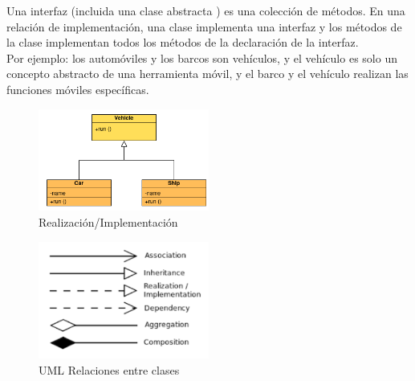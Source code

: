 \documentclass[../main.tex]{subfiles}
\begin{document}
\begin{enumerate}
                Una interfaz (incluida una clase abstracta ) es una colección de métodos. En una relación de implementación, una clase implementa una interfaz y los métodos de la clase implementan todos los métodos de la declaración de la interfaz.\\
                
                Por ejemplo: los automóviles y los barcos son vehículos, y el vehículo es solo un concepto abstracto de una herramienta móvil, y el barco y el vehículo realizan las funciones móviles específicas.


                \begin{figure}[ht]
                    \centering
                    \includegraphics[width=0.5\textwidth]{../images/uml_realizacion.png}
                    \caption{Realización/Implementación}
                    \label{fig:uml_realizacion}
                \end{figure}
        \end{enumerate}

        \begin{figure}[ht]
            \centering
            \includegraphics[width=0.5\textwidth]{../images/uml_relaciones.png}
            \caption{UML Relaciones entre clases}
            \label{fig:uml_relaciones}
        \end{figure}
\end{document}
